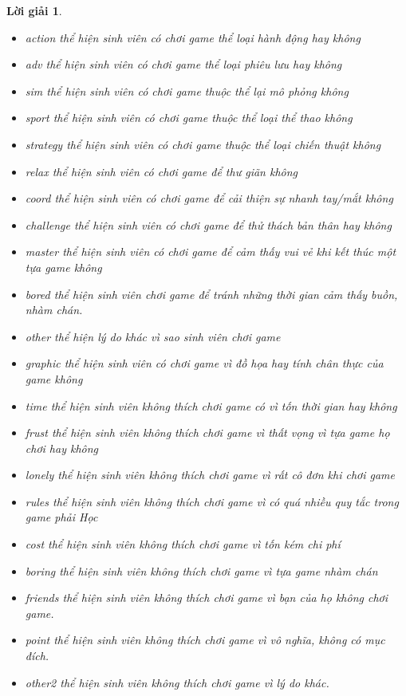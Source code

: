 \documentclass[14pt, a4paper]{article}
\theoremstyle{sltheorem}
\theoremstyle{soltheorem}
\newtheorem*{loigiai}{Lời giải}
\begin{document}
\begin{loigiai}
    \begin{itemize}
        \item action thể hiện sinh viên có chơi game thể loại hành động hay không
        \item adv thể hiện sinh viên có chơi game thể loại phiêu lưu hay không
        \item sim thể hiện sinh viên có chơi game thuộc thể lại mô phỏng không
        \item sport thể hiện sinh viên có chơi game thuộc thể loại thể thao không
        \item strategy thể hiện sinh viên có chơi game thuộc thể loại chiến thuật không
        \item relax thể hiện sinh viên có chơi game để thư giãn không
        \item coord thể hiện sinh viên có chơi game để cải thiện sự nhanh tay/mắt không
        \item challenge thể hiện sinh viên có chơi game để thử thách bản thân hay không
        \item master thể hiện sinh viên có chơi game để cảm thấy vui vẻ khi kết thúc một tựa game không
        \item bored thể hiện sinh viên chơi game để tránh những thời gian cảm thấy buồn, nhàm chán.
        \item other thể hiện lý do khác vì sao sinh viên chơi game
        \item graphic thể hiện sinh viên có chơi game vì đồ họa hay tính chân thực của game không
        \item time thể hiện sinh viên không thích chơi game có vì tốn thời gian hay không
        \item frust thể hiện sinh viên không thích chơi game vì thất vọng vì tựa game họ chơi hay không
        \item lonely thể hiện sinh viên không thích chơi game vì rất cô đơn khi chơi game
        \item rules thể hiện sinh viên không thích chơi game vì có quá nhiều quy tắc trong game phải Học
        \item cost thể hiện sinh viên không thích chơi game vì tốn kém chi phí
        \item boring thể hiện sinh viên không thích chơi game vì tựa game nhàm chán
        \item friends thể hiện sinh viên không thích chơi game vì bạn của họ không chơi game.
        \item point thể hiện sinh viên không thích chơi game vì vô nghĩa, không có mục đích.
        \item other2 thể hiện sinh viên không thích chơi game vì lý do khác.
    \end{itemize}


\end{loigiai}
\end{document}
